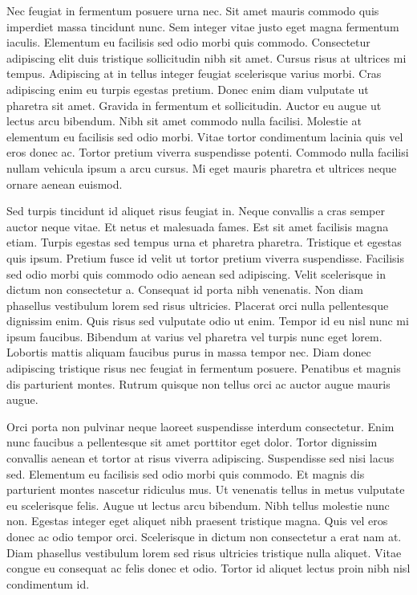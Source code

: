 \documentclass[11pt,a4paper]{article}
\begin{document}
Nec feugiat in fermentum posuere urna nec. Sit amet mauris commodo quis imperdiet massa tincidunt nunc. Sem integer vitae justo eget magna fermentum iaculis. Elementum eu facilisis sed odio morbi quis commodo. Consectetur adipiscing elit duis tristique sollicitudin nibh sit amet. Cursus risus at ultrices mi tempus. Adipiscing at in tellus integer feugiat scelerisque varius morbi. Cras adipiscing enim eu turpis egestas pretium. Donec enim diam vulputate ut pharetra sit amet. Gravida in fermentum et sollicitudin. Auctor eu augue ut lectus arcu bibendum. Nibh sit amet commodo nulla facilisi. Molestie at elementum eu facilisis sed odio morbi. Vitae tortor condimentum lacinia quis vel eros donec ac. Tortor pretium viverra suspendisse potenti. Commodo nulla facilisi nullam vehicula ipsum a arcu cursus. Mi eget mauris pharetra et ultrices neque ornare aenean euismod.

Sed turpis tincidunt id aliquet risus feugiat in. Neque convallis a cras semper auctor neque vitae. Et netus et malesuada fames. Est sit amet facilisis magna etiam. Turpis egestas sed tempus urna et pharetra pharetra. Tristique et egestas quis ipsum. Pretium fusce id velit ut tortor pretium viverra suspendisse. Facilisis sed odio morbi quis commodo odio aenean sed adipiscing. Velit scelerisque in dictum non consectetur a. Consequat id porta nibh venenatis. Non diam phasellus vestibulum lorem sed risus ultricies. Placerat orci nulla pellentesque dignissim enim. Quis risus sed vulputate odio ut enim. Tempor id eu nisl nunc mi ipsum faucibus. Bibendum at varius vel pharetra vel turpis nunc eget lorem. Lobortis mattis aliquam faucibus purus in massa tempor nec. Diam donec adipiscing tristique risus nec feugiat in fermentum posuere. Penatibus et magnis dis parturient montes. Rutrum quisque non tellus orci ac auctor augue mauris augue.

Orci porta non pulvinar neque laoreet suspendisse interdum consectetur. Enim nunc faucibus a pellentesque sit amet porttitor eget dolor. Tortor dignissim convallis aenean et tortor at risus viverra adipiscing. Suspendisse sed nisi lacus sed. Elementum eu facilisis sed odio morbi quis commodo. Et magnis dis parturient montes nascetur ridiculus mus. Ut venenatis tellus in metus vulputate eu scelerisque felis. Augue ut lectus arcu bibendum. Nibh tellus molestie nunc non. Egestas integer eget aliquet nibh praesent tristique magna. Quis vel eros donec ac odio tempor orci. Scelerisque in dictum non consectetur a erat nam at. Diam phasellus vestibulum lorem sed risus ultricies tristique nulla aliquet. Vitae congue eu consequat ac felis donec et odio. Tortor id aliquet lectus proin nibh nisl condimentum id.
\end{document}
